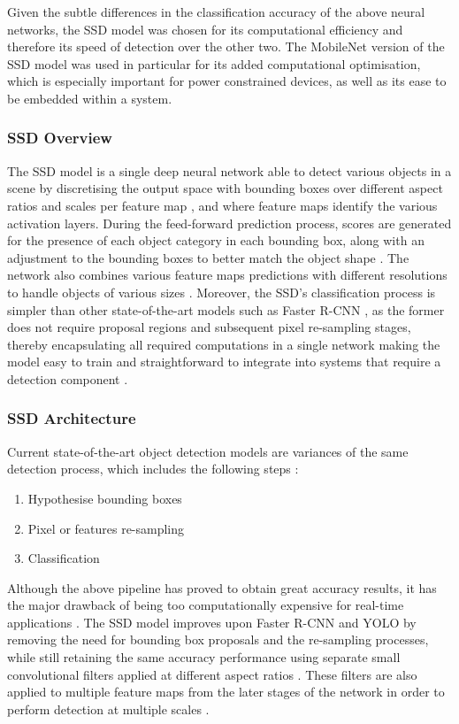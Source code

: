 Given the subtle differences in the classification accuracy of the above neural networks, the SSD model was chosen for its computational efficiency and therefore its speed of detection over the other two. The MobileNet version of the SSD model was used in particular for its added computational optimisation, which is especially important for power constrained devices, as well as its ease to be embedded within a system.

\subsubsection{SSD Overview}

The SSD model is a single deep neural network able to detect various objects in a scene by discretising the output space with bounding boxes over different aspect ratios and scales per feature map \cite{paper:SSD}, and where feature maps identify the various activation layers. During the feed-forward prediction process, scores are generated for the presence of each object category in each bounding box, along with an adjustment to the bounding boxes to better match the object shape \cite{paper:SSD}. The network also combines various feature maps predictions with different resolutions to handle objects of various sizes \cite{paper:SSD}. Moreover, the SSD's classification process is simpler than other state-of-the-art models such as Faster R-CNN \cite{paper:FRCNN}, as the former does not require proposal regions and subsequent pixel re-sampling stages, thereby encapsulating all required computations in a single network making the model easy to train and straightforward to integrate into systems that require a detection component \cite{paper:SSD}.

\subsubsection{SSD Architecture}

Current state-of-the-art object detection models are variances of the same detection process, which includes the following steps \cite{paper:SSD}:

\begin{enumerate}
  \item Hypothesise bounding boxes
  \item Pixel or features re-sampling
  \item Classification
\end{enumerate}

Although the above pipeline has proved to obtain great accuracy results, it has the major drawback of being too computationally expensive for real-time applications \cite{paper:SSD}. The SSD model improves upon Faster R-CNN \cite{paper:FRCNN} and YOLO \cite{paper:YOLO} by removing the need for bounding box proposals and the re-sampling processes, while still retaining the same accuracy performance using separate small convolutional filters applied at different aspect ratios \cite{paper:SSD}. These  filters are also applied to multiple feature maps from the later stages of the network in order to perform detection at multiple scales \cite{paper:SSD}.

